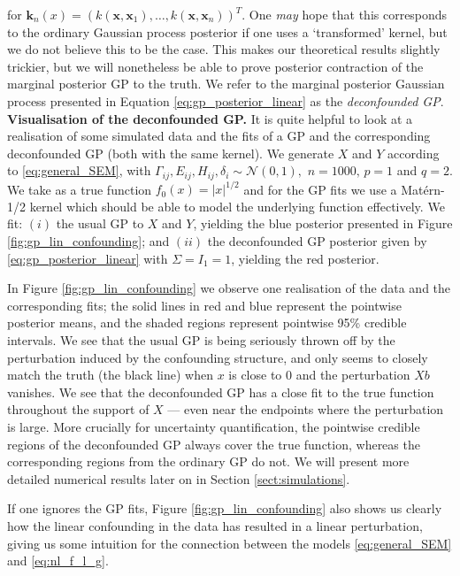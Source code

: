 \documentclass[11pt]{article}
\newcommand{\subparspace}{\vspace{3mm} \\}
\newcommand{\bx}{\mathbf{x}}
\begin{document}
for $\mathbf{k}_n(x) = (k(\bx, \bx_1), \dots, k(\bx, \bx_n))^T$. 
One {\it may} hope that this corresponds to the ordinary Gaussian process posterior if one uses a `transformed' kernel, but we do not believe this to be the case. This makes our theoretical results slightly trickier, but we will nonetheless be able to prove posterior contraction of the marginal posterior GP to the truth. We refer to the marginal posterior Gaussian process presented in Equation \eqref{eq:gp_posterior_linear} as the {\it deconfounded GP}.
\subparspace
{\bf Visualisation of the deconfounded GP.} It is quite helpful to look at a realisation of some simulated data and the fits of a GP and the corresponding deconfounded GP (both with the same kernel).
We generate $X$ and $Y$ according to \eqref{eq:general_SEM}, with $\Gamma_{ij}, E_{ij}, H_{ij}, \delta_{i} \sim \mathcal{N}(0, 1),$ $n = 1000, \, p = 1$ and $q = 2$. We take as a true function $f_0(x) = |x|^{1/2}$ and for the GP fits we use a Mat\'ern-1/2 kernel which should be able to model the underlying function effectively. We fit: $(i)$ the usual GP to $X$ and $Y$, yielding the blue posterior presented in Figure \ref{fig:gp_lin_confounding}; and $(ii)$ the deconfounded GP posterior given by \eqref{eq:gp_posterior_linear} with $\Sigma = I_1 = 1$, yielding the red posterior. 

In Figure \ref{fig:gp_lin_confounding} we observe one realisation of the data and the corresponding fits; the solid lines in red and blue represent the pointwise posterior means, and the shaded regions represent pointwise 95\% credible intervals. We see that the usual GP is being seriously thrown off by the perturbation induced by the confounding structure, and only seems to closely match the truth (the black line) when $x$ is close to 0 and the perturbation $Xb$ vanishes. We see that the deconfounded GP has a close fit to the true function throughout the support of $X$ --- even near the endpoints where the perturbation is large. More crucially for uncertainty quantification, the pointwise credible regions of the deconfounded GP always cover the true function, whereas the corresponding regions from the ordinary GP do not. We will present more detailed numerical results later on in Section \ref{sect:simulations}.

If one ignores the GP fits, Figure \ref{fig:gp_lin_confounding} also shows us clearly how the linear confounding in the data has resulted in a linear perturbation, giving us some intuition for the connection between the models \eqref{eq:general_SEM} and \eqref{eq:nl_f_l_g}.
\end{document}
